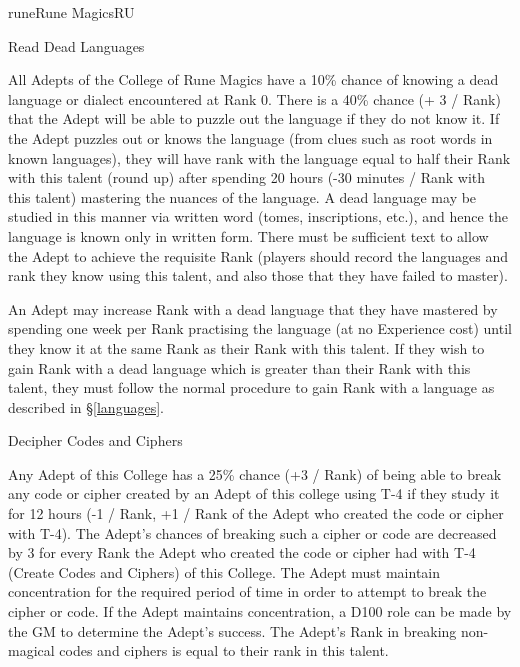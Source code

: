 \begin{college}[1.1]{rune}{Rune Magics}{RU}
\begin{talent}[T-1]{Read Dead Languages}
\begin{effects}
All Adepts of the College of Rune Magics have a 10\% chance of knowing
a dead language or dialect encountered at Rank 0.  There is a 40\%
chance (+ 3 / Rank) that the Adept will be able to puzzle out the
language if they do not know it.  If the Adept puzzles out or knows
the language (from clues such as root words in known languages), they
will have rank with the language equal to half their Rank with this
talent (round up) after spending 20 hours (-30 minutes / Rank with
this talent) mastering the nuances of the language. A dead language
may be studied in this manner via written word (tomes, inscriptions,
etc.), and hence the language is known only in written form. There
must be sufficient text to allow the Adept to achieve the requisite
Rank (players should record the languages and rank they know using
this talent, and also those that they have failed to master).

An Adept may increase Rank with a dead language that they have
mastered by spending one week per Rank practising the language (at no
Experience cost) until they know it at the same Rank as their Rank
with this talent. If they wish to gain Rank with a dead language which
is greater than their Rank with this talent, they must follow the
normal procedure to gain Rank with a language as described in
\S\ref{languages}.
\end{effects}
\end{talent}

\begin{talent}[T-2]{Decipher Codes and Ciphers}

\begin{effects}
Any Adept of this College has a 25\% chance (+3 / Rank) of being able
to break any code or cipher created by an Adept of this college using
T-4 if they study it for 12 hours (-1 / Rank, +1 / Rank of the Adept
who created the code or cipher with T-4).  The Adept's chances of
breaking such a cipher or code are decreased by 3 for every Rank the
Adept who created the code or cipher had with T-4 (Create Codes and
Ciphers) of this College.  The Adept must maintain concentration for
the required period of time in order to attempt to break the cipher or
code.  If the Adept maintains concentration, a D100 role can be made
by the GM to determine the Adept's success.  The Adept's Rank in
breaking non-magical codes and ciphers is equal to their rank in this
talent.
\end{effects}
\end{talent}


\end{college}
